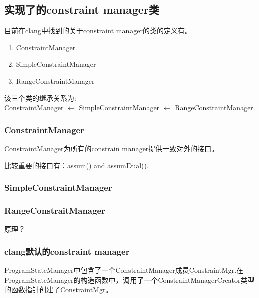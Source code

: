 \documentclass[a4paper]{article}
\begin{document}
  \subsection{实现了的constraint manager类}
  目前在clang中找到的关于constraint manager的类的定义有。
  \begin{enumerate}
    \item ConstraintManager
    \item SimpleConstraintManager
    \item RangeConstraintManager
  \end{enumerate}
  该三个类的继承关系为:\\ConstraintManager $\longleftarrow $ SimpleConstraintManager $\longleftarrow $ RangeConstraintManager.
  \subsubsection{ConstraintManager}
  ConstraintManager为所有的constrain manager提供一致对外的接口。
  
  
  比较重要的接口有：assum() and assumDual().
  \subsubsection{SimpleConstraintManager}
  
  \subsubsection{RangeConstraitManager}
  原理？
  \subsubsection{clang默认的constraint manager}
  ProgramStateManager中包含了一个ConstraintManager成员ConstraintMgr.在ProgramStateManager的构造函数中，调用了一个ConstraintManagerCreator类型的函数指针创建了ConstraintMgr。
  
\end{document}
